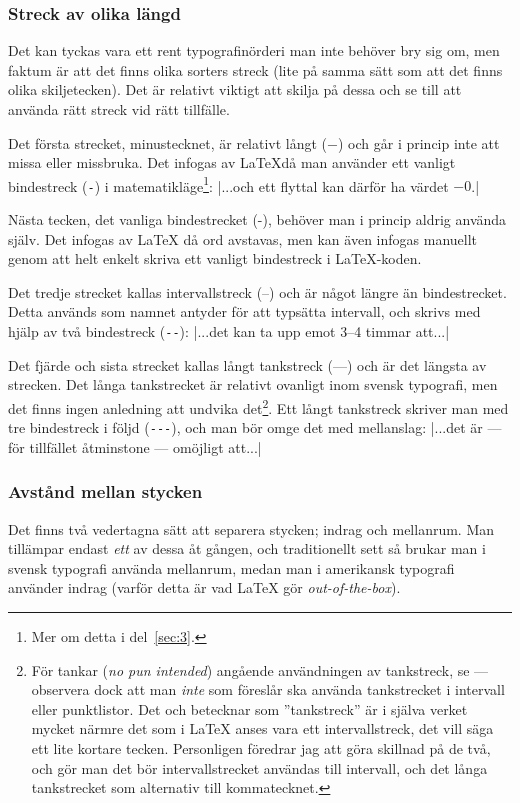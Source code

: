 \documentclass[../../latex.tex]{subfiles}
\begin{document}
\subsubsection{Streck av olika längd}
Det kan tyckas vara ett rent typografinörderi man inte behöver bry sig om,
men faktum är att det finns olika sorters streck (lite på samma sätt som
att det finns olika skiljetecken). Det är relativt viktigt att skilja på
dessa och se till att använda rätt streck vid rätt tillfälle.

Det första strecket, minustecknet, är relativt långt (\(-\)) och går i
princip inte att missa eller missbruka. Det infogas av \LaTeX då man
använder ett vanligt bindestreck (\verb|-|) i matematikläge\footnote{
Mer om detta i del~\ref{sec:3}.}:
\latex|...och ett flyttal kan därför ha värdet \(-0\).|

Nästa tecken, det vanliga bindestrecket (-), behöver man i princip aldrig
använda själv. Det infogas av \LaTeX{} då ord avstavas, men kan även
infogas manuellt genom att helt enkelt skriva ett vanligt bindestreck
i \LaTeX{}-koden.

Det tredje strecket kallas intervallstreck (–) och är något längre än
bindestrecket. Detta används som namnet antyder för att typsätta
intervall, och skrivs med hjälp av två bindestreck (\verb|--|):
\latex|...det kan ta upp emot 3--4 timmar att...|

Det fjärde och sista strecket kallas långt tankstreck (—) och är det längsta av
strecken. Det långa tankstrecket är relativt ovanligt inom svensk typografi, men det
finns ingen anledning att undvika det\footnote{För tankar (\emph{no pun
intended}) angående användningen av tankstreck, se 
 — observera dock att man \emph{inte} som 
 föreslår ska använda tankstrecket i intervall eller
punktlistor. Det  och  betecknar som
”tankstreck” är i själva verket mycket närmre det som i \LaTeX{} anses vara ett
intervallstreck, det vill säga ett lite kortare tecken. Personligen föredrar jag 
att göra skillnad på de två, och gör man det bör intervallstrecket användas till
intervall, och det långa tankstrecket som alternativ till kommatecknet.}.
Ett långt tankstreck skriver man med tre bindestreck i följd
(\verb|---|), och man bör omge det med mellanslag:
\latex|...det är --- för tillfället åtminstone --- omöjligt att...|

\subsubsection{Avstånd mellan stycken}
Det finns två vedertagna sätt att separera stycken; indrag och
mellanrum. Man tillämpar endast \emph{ett} av dessa åt gången, och
traditionellt sett så brukar man i svensk typografi använda mellanrum,
medan man i amerikansk typografi använder indrag (varför detta är vad
\LaTeX{} gör \emph{out-of-the-box}).
\end{document}
